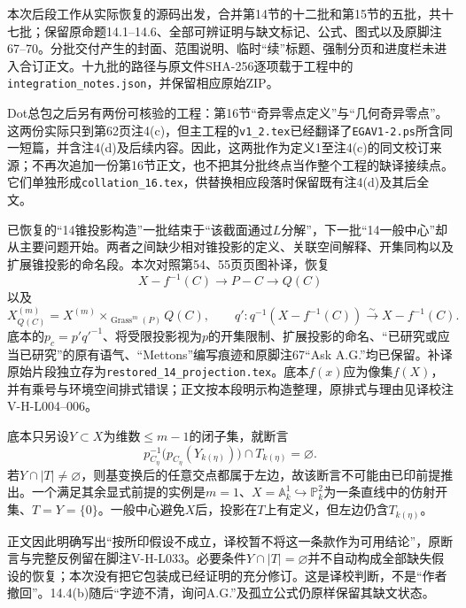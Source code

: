 本次后段工作从实际恢复的源码出发，合并第14节的十二批和第15节的五批，共十七批；保留原命题14.1--14.6、全部可辨证明与缺文标记、公式、图式以及原脚注67--70。分批交付产生的封面、范围说明、临时“续”标题、强制分页和进度栏未进入合订正文。十九批的路径与原文件SHA-256逐项载于工程中的\texttt{integration\_notes.json}，并保留相应原始ZIP。

Dot总包之后另有两份可核验的工程：第16节“奇异零点定义”与“几何奇异零点”。这两份实际只到第62页注4(c)，但主工程的\texttt{v1\_2.tex}已经翻译了\texttt{EGAV1-2.ps}所含同一短篇，并含注4(d)及后续内容。因此，这两批作为定义1至注4(c)的同文校订来源；不再次追加一份第16节正文，也不把其分批终点当作整个工程的缺译接续点。它们单独形成\texttt{collation\_16.tex}，供替换相应段落时保留既有注4(d)及其后全文。

已恢复的“14锥投影构造”一批结束于“该截面通过$L$分解”，下一批“14一般中心”却从主要问题开始。两者之间缺少相对锥投影的定义、关联空间解释、开集同构以及扩展锥投影的命名段。本次对照第54、55页页图补译，恢复
\[
X-f^{-1}(C)\longrightarrow P-C\longrightarrow Q(C)
\]
以及
\[
X^{(m)}_{Q(C)}=X^{(m)}\times_{\operatorname{Grass}^{m}(P)}Q(C),
\qquad
q':q^{-1}(X-f^{-1}(C))\xrightarrow{\sim}X-f^{-1}(C).
\]
底本的$p_c=p'q'^{-1}$、将受限投影视为$p$的开集限制、扩展投影的命名、“已研究或应当已研究”的原有语气、“Mettons”编写痕迹和原脚注67“Ask A.G.”均已保留。补译原始片段独立存为\texttt{restored\_14\_projection.tex}。底本$f(x)$应为像集$f(X)$，并有乘号与环境空间排式错误；正文按本段明示构造整理，原排式与理由见译校注V-H-L004--006。

底本只另设$Y\subset X$为维数$\leq m-1$的闭子集，就断言
\[
p_{C_\eta}^{-1}\bigl(p_{C_\eta}(Y_{k(\eta)})\bigr)
\cap T_{k(\eta)}=\varnothing.
\]
若$Y\cap|T|\ne\varnothing$，则基变换后的任意交点都属于左边，故该断言不可能由已印前提推出。一个满足其余显式前提的实例是$m=1$、$X=\mathbb A^1_k\hookrightarrow\mathbb P^2_k$为一条直线中的仿射开集、$T=Y=\{0\}$。一般中心避免$X$后，投影在$T$上有定义，但左边仍含$T_{k(\eta)}$。

正文因此明确写出“按所印假设不成立，译校暂不将这一条款作为可用结论”，原断言与完整反例留在脚注V-H-L033。必要条件$Y\cap|T|=\varnothing$并不自动构成全部缺失假设的恢复；本次没有把它包装成已经证明的充分修订。这是译校判断，不是“作者撤回”。14.4(b)随后“字迹不清，询问A.G.”及孤立公式仍原样保留其缺文状态。

